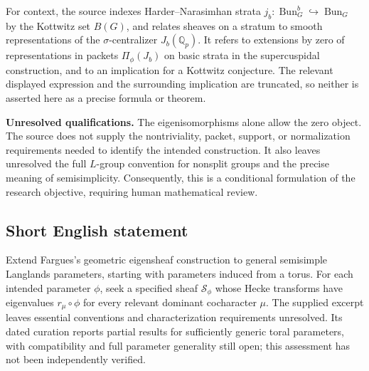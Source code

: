\documentclass[11pt]{article}
\newcommand{\Q}{\mathbb{Q}}
\begin{document}
For context, the source indexes Harder--Narasimhan strata \(j_b\colon\operatorname{Bun}_G^b\hookrightarrow\operatorname{Bun}_G\) by the Kottwitz set \(B(G)\), and relates sheaves on a stratum to smooth representations of the \(\sigma\)-centralizer \(J_b(\Q_p)\). It refers to extensions by zero of representations in packets \(\Pi_\phi(J_b)\) on basic strata in the supercuspidal construction, and to an implication for a Kottwitz conjecture. The relevant displayed expression and the surrounding implication are truncated, so neither is asserted here as a precise formula or theorem.

\textbf{Unresolved qualifications.} The eigenisomorphisms alone allow the zero object. The source does not supply the nontriviality, packet, support, or normalization requirements needed to identify the intended construction. It also leaves unresolved the full \(L\)-group convention for nonsplit groups and the precise meaning of semisimplicity. Consequently, this is a conditional formulation of the research objective, requiring human mathematical review.
\subsection{Short English statement}
Extend Fargues's geometric eigensheaf construction to general semisimple Langlands parameters, starting with parameters induced from a torus. For each intended parameter \(\phi\), seek a specified sheaf \(\mathcal S_\phi\) whose Hecke transforms have eigenvalues \(r_\mu\circ\phi\) for every relevant dominant cocharacter \(\mu\). The supplied excerpt leaves essential conventions and characterization requirements unresolved. Its dated curation reports partial results for sufficiently generic toral parameters, with compatibility and full parameter generality still open; this assessment has not been independently verified.
\end{document}
